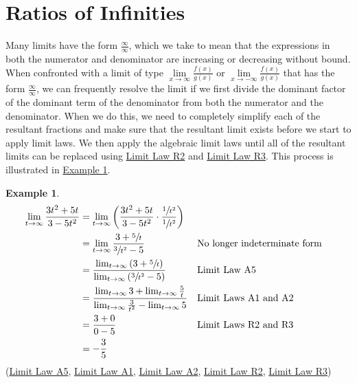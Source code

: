 \documentclass[12pt,]{book}
\theoremstyle{plain}
\theoremstyle{definition}
\newtheorem{example}[theorem]{Example}
\numberwithin{equation}{section}
\newcommand{\fe}[2]{#1\mathopen{}\left(#2\right)\mathclose{}}
\begin{document}
\section[Ratios of Infinities]{Ratios of Infinities}\label{section-ratios-of-infinities}
Many limits have the form \(\frac{\infty}{\infty}\), which we take to mean that the expressions in both the numerator and denominator are increasing or decreasing without bound. When confronted with a limit of type \(\lim\limits_{x\to\infty}\frac{\fe{f}{x}}{\fe{g}{x}}\) or \(\lim\limits_{x\to-\infty}\frac{\fe{f}{x}}{\fe{g}{x}}\) that has the form \(\frac{\infty}{\infty}\), we can frequently resolve the limit if we first divide the dominant factor of the dominant term of the denominator from both the numerator and the denominator. When we do this, we need to completely simplify each of the resultant fractions and make sure that the resultant limit exists before we start to apply limit laws. We then apply the algebraic limit laws until all of the resultant limits can be replaced using \hyperref[llr2]{Limit Law R2} and \hyperref[llr3]{Limit Law R3}. This process is illustrated in \hyperref[example-ratio-of-infinities]{Example \ref{example-ratio-of-infinities}}.%
\begin{example}\label{example-ratio-of-infinities}
\begin{align*}
\lim_{t\to\infty}\frac{3t^2+5t}{3-5t^2}&=\lim_{t\to\infty}\left(\frac{3t^2+5t}{3-5t^2}\cdot\frac{\sfrac{1}{t^2}}{\sfrac{1}{t^2}}\right)\\
&=\lim_{t\to\infty}\frac{3+\sfrac{5}{t}}{\sfrac{3}{t^2}-5}&&\text{No longer indeterminate form}\\
&=\frac{\lim_{t\to\infty}\left(3+\sfrac{5}{t}\right)}{\lim_{t\to\infty}\left(\sfrac{3}{t^2}-5\right)}&&\text{Limit Law A5}\\
&=\frac{\lim_{t\to\infty}3+\lim_{t\to\infty}\frac{5}{t}}{\lim_{t\to\infty}\frac{3}{t^2}-\lim_{t\to\infty}5}&&\text{Limit Laws A1 and A2}\\
&=\frac{3+0}{0-5}&&\text{Limit Laws R2 and R3}\\
&=-\frac{3}{5}
\end{align*}(\hyperref[lla5]{Limit Law A5}, \hyperref[lla1]{Limit Law A1}, \hyperref[lla2]{Limit Law A2}, \hyperref[llr2]{Limit Law R2}, \hyperref[llr3]{Limit Law R3})%
\end{example}
\typeout{************************************************}
\typeout{************************************************}
\end{document}
